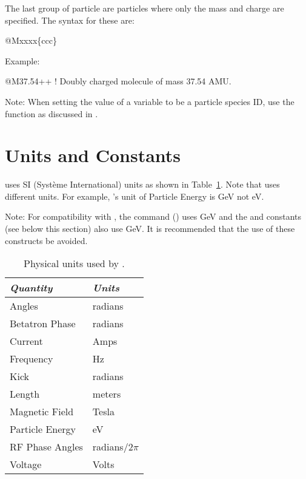{{{{{The last group of particle are particles where only the mass and charge are specified.  The syntax
for these are:
\begin{example}
  @Mxxxx\{ccc\}
\end{example}
Example:
\begin{example}
  @M37.54++    ! Doubly charged molecule of mass 37.54 AMU.
\end{example}

Note: When setting the value of a variable to be a particle species ID, use the  function as discussed
in .

\newpage

\section{Units and Constants}
\label{s:constants}

\bmad uses SI (Syst\`eme International) units as shown in Table~\ref{t:units}.  Note that \mad uses
different units. For example, \mad's unit of Particle Energy is GeV not eV. 

Note: For compatibility with \mad, the  command () uses GeV
and the  and  constants (see below this section) also use GeV. It is recommended that
the use of these constructs be avoided.

\begin{table}[ht]
\centering
\begin{tabular}{ll} \toprule
  {\em Quantity}     & {\em Units}       \\ \midrule
  Angles             &    radians        \\ 
  Betatron Phase     &    radians        \\
  Current            &    Amps           \\ 
  Frequency          &    Hz             \\ 
  Kick               &    radians        \\ 
  Length             &    meters         \\ 
  Magnetic Field     &    Tesla          \\ 
  Particle Energy    &    eV             \\ 
  RF Phase Angles    &    radians/2$\pi$ \\ 
  Voltage            &    Volts          \\ \bottomrule
\end{tabular}
\caption{Physical units used by \bmad.}
\label{t:units}
\end{table}

}}}}}
